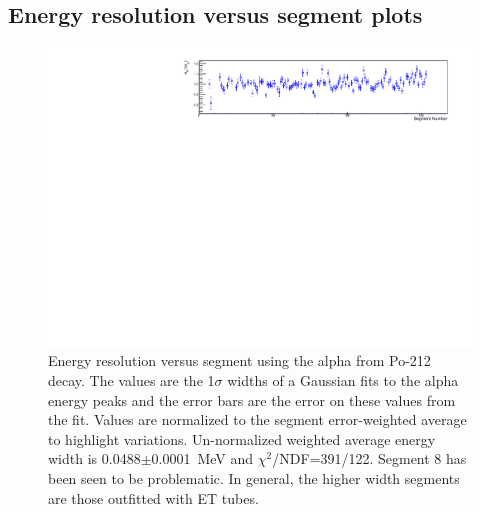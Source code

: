 \subsection{Energy resolution versus segment plots}
\begin{figure}[!h]
\centering
\includegraphics[width=1.05\textwidth]{figures/PubBiPo212EresvsCell.pdf}
\caption{\label{fig:EresvsCell212}Energy resolution versus segment using the alpha from Po-212 decay. The values are the 1$\sigma$ widths of a Gaussian fits to the alpha energy peaks and the error bars are the error on these values from the fit. Values are normalized to the segment error-weighted average to highlight variations. Un-normalized weighted average energy width is 0.0488$\pm$0.0001~MeV and $\chi^2$/NDF=391/122. Segment 8 has been seen to be problematic. In general, the higher width segments are those outfitted with ET tubes.}
\end{figure}
